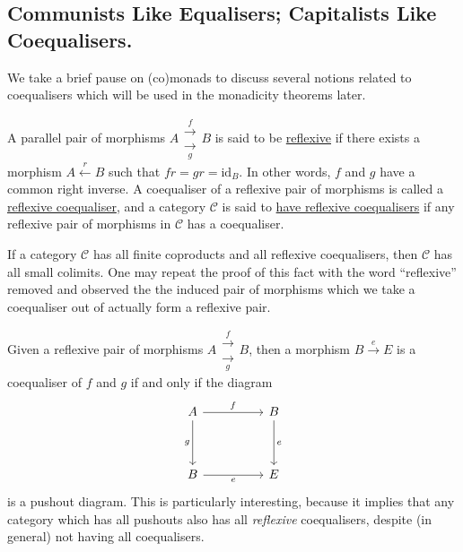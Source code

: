 \documentclass[a4paper,11pt]{article}
\theoremstyle{break_italics}
\theoremstyle{break_upright}
\theoremstyle{remark}
\newcommand{\id}{\mathrm{id}}
\newcommand{\C}{\mathcal{C}}
\begin{document}
\subsection{Communists Like Equalisers; Capitalists Like Coequalisers.}

We take a brief pause on (co)monads to discuss several notions related to coequalisers which will be used in the monadicity theorems later.

A parallel pair of morphisms $A \substack{\xrightarrow{f} \\ \xrightarrow[g]{}} B$ is said to be \uline{reflexive} if there exists a morphism $A \xleftarrow{r} B$ such that $fr = gr = \id_B$. In other words, $f$ and $g$ have a common right inverse. A coequaliser of a reflexive pair of morphisms is called a \uline{reflexive coequaliser}, and a category $\C$ is said to \uline{have reflexive coequalisers} if any reflexive pair of morphisms in $\C$ has a coequaliser.

If a category $\C$ has all finite coproducts and all reflexive coequalisers, then $\C$ has all small colimits. One may repeat the proof of this fact with the word ``reflexive'' removed and observed the the induced pair of morphisms which we take a coequaliser out of actually form a reflexive pair.

Given a reflexive pair of morphisms $A \substack{\xrightarrow{f} \\ \xrightarrow[g]{}} B$, then a morphism $B \xrightarrow{e} E$ is a coequaliser of $f$ and $g$ if and only if the diagram
\[
\begin{tikzcd}
A \arrow[rr, "f"] \arrow[dd, "g"'] &  & B \arrow[dd, "e"] \\
                                   &  &                   \\
B \arrow[rr, "e"']                 &  & E                
\end{tikzcd}
\]
is a pushout diagram. This is particularly interesting, because it implies that any category which has all pushouts also has all \textit{reflexive} coequalisers, despite (in general) not having all coequalisers.
\end{document}
